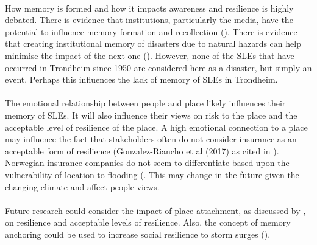 \paragraph{}
How memory is formed and how it impacts awareness and resilience is highly debated. There is evidence that institutions, particularly the media, have the potential to influence memory formation and recollection (\cite{de_guttry_expiry_2022}). There is evidence that creating institutional memory of disasters due to natural hazards can help minimise the impact of the next one (\cite{de_guttry_expiry_2022}). However, none of the SLEs that have occurred in Trondheim since 1950 are considered here as a disaster, but simply an event. Perhaps this influences the lack of memory of SLEs in Trondheim. 
\paragraph{}

The emotional relationship between people and place likely influences their memory of SLEs. It will also influence their views on risk to the place and the acceptable level of resilience of the place. A high emotional connection to a place may influence the fact that stakeholders often do not consider insurance as an acceptable form of resilience (Gonzalez-Riancho et al (2017) as cited in \cite{gerkensmeier_governing_2018}). Norwegian insurance companies do not seem to differentiate based upon the vulnerability of location to flooding (\cite{lujala_role_2020)}. This may change in the future given the changing climate and affect people views.
\paragraph{}
Future research could consider the impact of place attachment, as discussed by \cite{ariccio_place_2021}, on resilience and acceptable levels of resilience. Also, the concept of memory anchoring could be used to increase social resilience to storm surges (\cite{de_guttry_expiry_2022}).  


